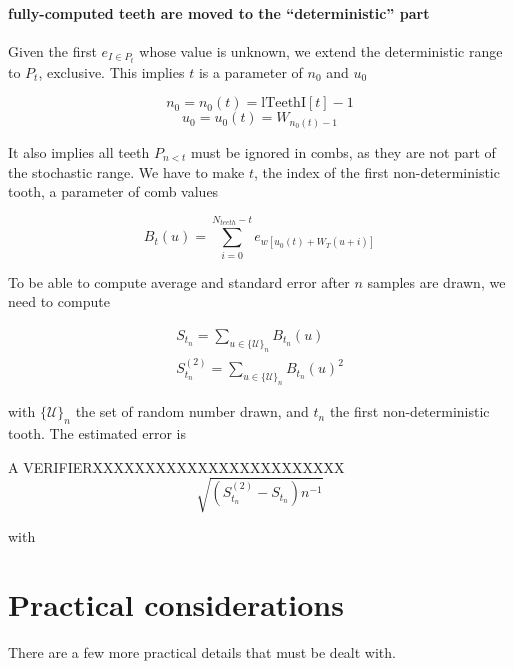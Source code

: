 \documentclass[./thesis.tex]{subfiles}
\newcommand{\lTeethI}{\text{lTeethI}}
\begin{document}
\paragraph{fully-computed teeth are moved to the ``deterministic'' part}
Given the first $e_{I \in P_t}$ whose value is unknown, we extend the deterministic range to $P_t$, exclusive. This implies $t$ is a parameter of $n_0$ and $u_0$

\begin{equation}
n_0 = n_0(t) = \lTeethI[t]-1
\end{equation}
\begin{equation}
u_0 = u_0(t) = W_{n_0(t) -1}
\end{equation}

It also implies all teeth $P_{n<t}$ must be ignored in combs, as they are not part of the stochastic range. We have to make $t$, the index of the first non-deterministic tooth, a parameter of comb values

\begin{equation}
B_t(u) = \sum_{i=0}^{N_{teeth}-t} e_{w[u_0(t)+ W_T(u+i)]}
\end{equation}

To be able to compute average and standard error after $n$ samples are drawn, we need to compute

\begin{align}
 S_{t_n} = \sum_{u \in \{\mathcal{U}\}_n} B_{t_n}(u) \\
 S^{(2)}_{t_n} = \sum_{u \in \{\mathcal{U}\}_n} B_{t_n}(u)^2
\end{align}

with $\{\mathcal{U}\}_n$ the set of random number drawn, and $t_n$ the first non-deterministic tooth. The estimated error is

\alert{A VERIFIERXXXXXXXXXXXXXXXXXXXXXXXX}
\begin{equation}
\sqrt{(S_{t_n}^{(2)} - S_{t_n}) n^{-1} }
\end{equation}		

with 

\section{Practical considerations}

There are a few more practical details that must be dealt with.
\end{document}
